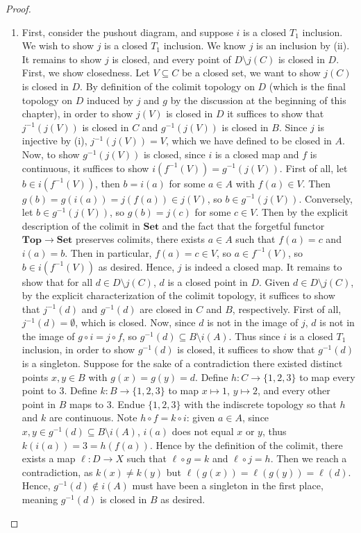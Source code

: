 \documentclass{amsart}
\theoremstyle{plain}
\theoremstyle{definition}
\newcommand{\Top}{\mbf{Top}}
\newcommand{\Set}{\mbf{Set}}
\newcommand{\sseq}{\subseteq}
\newcommand{\0}{\mathbf{0}}
\newcommand{\mbf}[1]{\mathbf{#1}}
\renewcommand{\(}{\left(}
\renewcommand{\)}{\right)}
\begin{document}
\begin{proof}
\begin{enumerate}[label=(\roman*),listparindent=\parindent,parsep=0pt]
    \item First, consider the pushout diagram, and suppose $i$ is a closed $T_1$ inclusion. We wish to show $j$ is a closed $T_1$ inclusion. We know $j$ is an inclusion by (ii). It remains to show $j$ is closed, and every point of $D\setminus j(C)$ is closed in $D$. First, we show closedness. Let $V\sseq C$ be a closed set, we want to show $j(C)$ is closed in $D$. By definition of the colimit topology on $D$ (which is the final topology on $D$ induced by $j$ and $g$ by the discussion at the beginning of this chapter), in order to show $j(V)$ is closed in $D$ it suffices to show that $j^{-1}(j(V))$ is closed in $C$ and $g^{-1}(j(V))$ is closed in $B$. Since $j$ is injective by (i), $j^{-1}(j(V))=V$, which we have defined to be closed in $A$. Now, to show $g^{-1}(j(V))$ is closed, since $i$ is a closed map and $f$ is continuous, it suffices to show $i(f^{-1}(V))=g^{-1}(j(V))$. First of all, let $b\in i(f^{-1}(V))$, then $b=i(a)$ for some $a\in A$ with $f(a)\in V$. Then $g(b)=g(i(a))=j(f(a))\in j(V)$, so $b\in g^{-1}(j(V))$. Conversely, let $b\in g^{-1}(j(V))$, so $g(b)=j(c)$ for some $c\in V$. Then by the explicit description of the colimit in $\Set$ and the fact that the forgetful functor $\Top\to\Set$ preserves colimits, there exists $a\in A$ such that $f(a)=c$ and $i(a)=b$. Then in particular, $f(a)=c\in V$, so $a\in f^{-1}(V)$, so $b\in i(f^{-1}(V))$ as desired. Hence, $j$ is indeed a closed map. It remains to show that for all $d\in D\setminus j(C)$, $d$ is a closed point in $D$. Given $d\in D\setminus j(C)$, by the explicit characterization of the colimit topology, it suffices to show that $j^{-1}(d)$ and $g^{-1}(d)$ are closed in $C$ and $B$, respectively. First of all, $j^{-1}(d)=\emptyset$, which is closed. Now, since $d$ is not in the image of $j$, $d$ is not in the image of $g\circ i=j\circ f$, so $g^{-1}(d)\sseq B\setminus i(A)$. Thus since $i$ is a closed $T_1$ inclusion, in order to show $g^{-1}(d)$ is closed, it suffices to show that $g^{-1}(d)$ is a singleton. Suppose for the sake of a contradiction there existed distinct points $x,y\in B$ with $g(x)=g(y)=d$. Define $h:C\to\{1,2,3\}$ to map every point to $3$. Define $k:B\to\{1,2,3\}$ to map $x\mapsto 1$, $y\mapsto 2$, and every other point in $B$ maps to $3$. Endue $\{1,2,3\}$ with the indiscrete topology so that $h$ and $k$ are continuous. Note $h\circ f=k\circ i$: given $a\in A$, since $x,y\in g^{-1}(d)\sseq B\setminus i(A)$, $i(a)$ does not equal $x$ or $y$, thus $k(i(a))=3=h(f(a))$. Hence by the definition of the colimit, there exists a map $\ell:D\to X$ such that $\ell\circ g=k$ and $\ell\circ j=h$. Then we reach a contradiction, as $k(x)\neq k(y)$ but $\ell(g(x))=\ell(g(y))=\ell(d)$. Hence, $g^{-1}(d)\notin i(A)$ must have been a singleton in the first place, meaning $g^{-1}(d)$ is closed in $B$ as desired.
    

\end{enumerate}
\end{proof}
\end{document}
